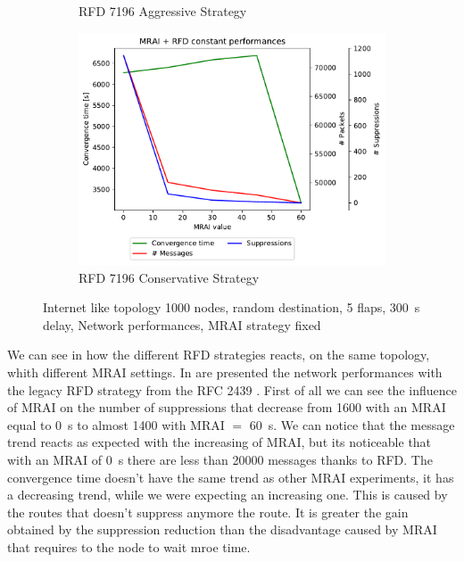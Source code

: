\begin{figure}[h]
\begin{subfigure}[b]{0.325\textwidth}
         \caption{RFD 7196 Aggressive Strategy}
         \label{fig:1000_7196RFDA_multiMRAI_mice}
     \end{subfigure}
     \hfill
     \begin{subfigure}[b]{0.325\textwidth}
         \centering
         \includegraphics[width=\textwidth]{images/RFD/miceVSelephants/MultiMRAI/mice/cisco_1000_RFD_7196_conservative-constant_mrai_rfd_evolution.pdf}
         \caption{RFD 7196 Conservative Strategy}
         \label{fig:1000_7196RFDC_multiMRAI_mice}
     \end{subfigure}
		\caption{Internet like topology \num{1000} nodes, random destination, 
		\num{5} flaps, \SI{300}{\second} delay, Network performances, \ac{MRAI}
		strategy fixed}
        \label{fig:1000_RFD_multiMRAI_mice}
\end{figure}


We can see in  how the different \ac{RFD} strategies
reacts, on the same topology, whith different \ac{MRAI} settings.
In  are presented the network performances
with the legacy \ac{RFD} strategy from the \ac{RFC} \num{2439} \cite{rfc2439}.
First of all we can see the influence of \ac{MRAI} on the number of suppressions
that decrease from \num{1600} with an \ac{MRAI} equal to \SI{0}{\second} to almost
\num{1400} with \ac{MRAI} $=$ \SI{60}{\second}.
We can notice that the message trend reacts as expected with the increasing of
\ac{MRAI}, but its noticeable that with an \ac{MRAI} of \SI{0}{\second} there
are less than \num{20000} messages thanks to \ac{RFD}.
The convergence time doesn't have the same trend as other \ac{MRAI} experiments,
it has a decreasing trend, while we were expecting an increasing one.
This is caused by the routes that doesn't suppress anymore the route.
It is greater the gain obtained by the suppression reduction than the disadvantage
caused by \ac{MRAI} that requires to the node to wait mroe time.

